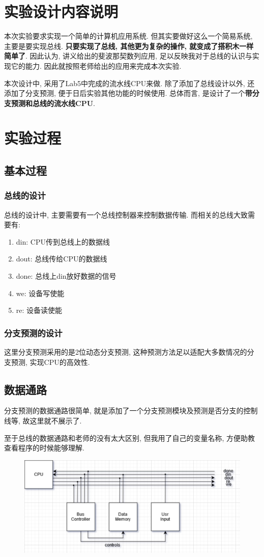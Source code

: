 \documentclass[UTF8]{article}
\begin{document}
\section{实验设计内容说明}
本次实验要求实现一个简单的计算机应用系统. 但其实要做好这么一个简易系统, 主要是要实现总线. \textbf{只要实现了总线, 其他更为复杂的操作, 就变成了搭积木一样简单了}. 因此认为, 讲义给出的斐波那契数列应用, 足以反映我对于总线的认识与实现它的能力. 因此就按照老师给出的应用来完成本次实验.\par
本次设计中, 采用了Lab5中完成的流水线CPU来做. 除了添加了总线设计以外, 还添加了分支预测, 便于日后实验其他功能的时候使用. 总体而言, 是设计了一个\textbf{带分支预测和总线的流水线CPU}.

\section{实验过程}
\subsection{基本过程}
\subsubsection{总线的设计}
总线的设计中, 主要需要有一个总线控制器来控制数据传输. 而相关的总线大致需要有:
\begin{enumerate}
	\item din: CPU传到总线上的数据线
	\item dout: 总线传给CPU的数据线
	\item done: 总线上din放好数据的信号
	\item we: 设备写使能
	\item re: 设备读使能
\end{enumerate}
\subsubsection{分支预测的设计}
这里分支预测采用的是2位动态分支预测, 这种预测方法足以适配大多数情况的分支预测, 实现CPU的高效性.
\subsection{数据通路}
分支预测的数据通路很简单, 就是添加了一个分支预测模块及预测是否分支的控制线等, 故这里就不展示了.\par
至于总线的数据通路和老师的没有太大区别, 但我用了自己的变量名称, 方便助教查看程序的时候能够理解.
\begin{figure}[H]
	\centering
	\includegraphics[width=\linewidth]{data_path.png}
	\label{data_path}
\end{figure}
\end{document}

